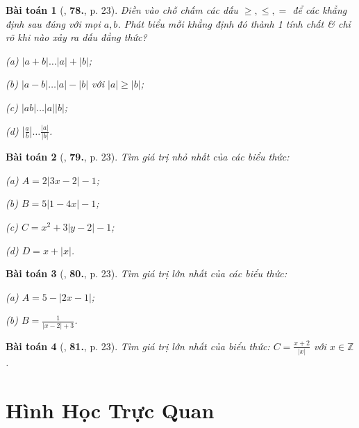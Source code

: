 \documentclass{article}
\numberwithin{equation}{section}
\newtheorem{baitoan}{Bài toán}[section]
\begin{document}
\begin{baitoan}[\cite{Binh_Toan_7_tap_1}, \textbf{78.}, p. 23]
	Điền vào chỗ chấm các dấu $\ge,\le,=$ để các khẳng định sau đúng với mọi $a,b$. Phát biểu mỗi khẳng định đó thành 1 tính chất \& chỉ rõ khi nào xảy ra dấu đẳng thức?
	\begin{enumerate*}
		\item[(a)] $|a + b|\ldots|a| + |b|$;
		\item[(b)] $|a - b|\ldots|a| - |b|$ với $|a|\ge|b|$;
		\item[(c)] $|ab|\ldots|a||b|$;
		\item[(d)] $\left|\frac{a}{b}\right|\ldots\frac{|a|}{|b|}$.
	\end{enumerate*}
\end{baitoan}

\begin{baitoan}[\cite{Binh_Toan_7_tap_1}, \textbf{79.}, p. 23]
	Tìm giá trị nhỏ nhất của các biểu thức:
	\begin{enumerate*}
		\item[(a)] $A = 2|3x - 2| - 1$;
		\item[(b)] $B = 5|1 - 4x| - 1$;
		\item[(c)] $C = x^2 + 3|y - 2| - 1$;
		\item[(d)] $D = x + |x|$.
	\end{enumerate*}
\end{baitoan}

\begin{baitoan}[\cite{Binh_Toan_7_tap_1}, \textbf{80.}, p. 23]
	Tìm giá trị lớn nhất của các biểu thức:
	\begin{enumerate*}
		\item[(a)] $A = 5 - |2x - 1|$;
		\item[(b)] $B = \frac{1}{|x - 2| + 3}$.
	\end{enumerate*}
\end{baitoan}

\begin{baitoan}[\cite{Binh_Toan_7_tap_1}, \textbf{81.}, p. 23]
	Tìm giá trị lớn nhất của biểu thức: $C = \frac{x + 2}{|x|}$ với $x\in\mathbb{Z}$.
\end{baitoan}


\section{Hình Học Trực Quan}
\end{document}
